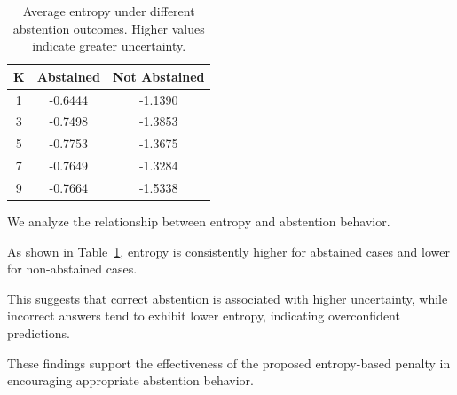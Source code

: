 \begin{table}[h]
\centering
\caption{Average entropy under different abstention outcomes. Higher values indicate greater uncertainty.}
\label{tab:abstention}
\begin{tabular}{ccc}
\toprule
K & Abstained & Not Abstained \\
\midrule
1 & -0.6444 & -1.1390 \\
3 & -0.7498 & -1.3853 \\
5 & -0.7753 & -1.3675 \\
7 & -0.7649 & -1.3284 \\
9 & -0.7664 & -1.5338 \\
\bottomrule
\end{tabular}
\end{table}

We analyze the relationship between entropy and abstention behavior.

As shown in Table~\ref{tab:abstention}, entropy is consistently higher for abstained cases and lower for non-abstained cases.

This suggests that correct abstention is associated with higher uncertainty, while incorrect answers tend to exhibit lower entropy, indicating overconfident predictions.

These findings support the effectiveness of the proposed entropy-based penalty in encouraging appropriate abstention behavior.